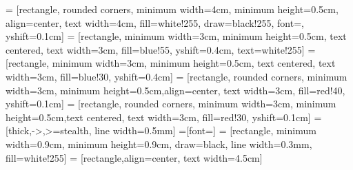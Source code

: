 \documentclass[]{article}
\begin{document}

 = [rectangle, rounded corners, minimum width=4cm, minimum height=0.5cm, align=center, text width=4cm, fill=white!255, draw=black!255, font=\small, yshift=0.1cm]
 = [rectangle, minimum width=3cm, minimum height=0.5cm, text centered, text width=3cm, fill=blue!55, yshift=0.4cm, text=white!255]
 = [rectangle, minimum width=3cm, minimum height=0.5cm, text centered, text width=3cm, fill=blue!30, yshift=0.4cm]
 = [rectangle, rounded corners, minimum width=3cm, minimum height=0.5cm,align=center, text width=3cm, fill=red!40, yshift=0.1cm]
 = [rectangle, rounded corners, minimum width=3cm, minimum height=0.5cm,text centered, text width=3cm, fill=red!30, yshift=0.1cm]
 = [thick,->,>=stealth, line width=0.5mm]
=[font=\scriptsize]
 = [rectangle, minimum width=0.9cm, minimum height=0.9cm, draw=black, line width=0.3mm, fill=white!255]
 = [rectangle,align=center, text width=4.5cm]
\end{document}
